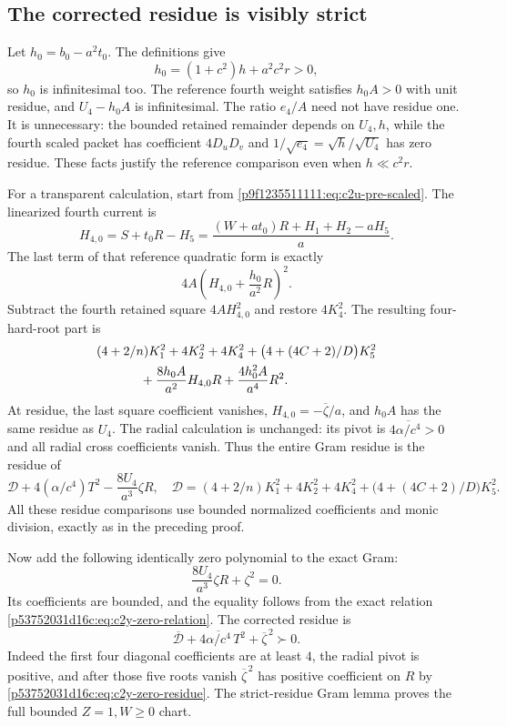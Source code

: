 \subsection{The corrected residue is visibly strict}
Let $h_0=b_0-a^2t_0$.  The definitions give
\begin{equation}
h_0=(1+c^2)h+a^2c^2r>0,
\label{p53752031d16c:eq:c2y-h0}
\end{equation}
so $h_0$ is infinitesimal too.  The reference fourth weight satisfies
$h_0A>0$ with unit residue, and $U_4-h_0A$ is infinitesimal.
The ratio $e_4/A$ need not have residue one.  It is unnecessary:
the bounded retained remainder depends on $U_4,h$, while the fourth
scaled packet has coefficient $4D_uD_v$ and
$1/\sqrt{e_4}=\sqrt h/\sqrt{U_4}$ has zero residue.  These facts
justify the reference comparison even when $h\ll c^2r$.

For a transparent calculation, start from
\eqref{p9f1235511111:eq:c2u-pre-scaled}.  The linearized fourth current is
\[
H_{4,0}=S+t_0R-H_5
=\frac{(W+at_0)R+H_1+H_2-aH_5}{a}.
\]
The last term of that reference quadratic form is exactly
\[
4A\left(H_{4,0}+\frac{h_0}{a^2}R\right)^2.
\]
Subtract the fourth retained square $4AH_{4,0}^2$ and restore
$4K_4^2$.  The resulting four-hard-root part is
\[
\begin{split}
&(4+2/n)K_1^2+4K_2^2+4K_4^2
 +\bigl(4+(4C+2)/D\bigr)K_5^2\\
&\hspace{12mm}+\frac{8h_0A}{a^2}H_{4,0}R
 +\frac{4h_0^2A}{a^4}R^2.
\end{split}
\]
At residue, the last square coefficient vanishes,
$H_{4,0}=-\overline\zeta/a$, and $h_0A$ has the same residue as $U_4$.
The radial calculation is unchanged: its pivot is
$4\overline{\alpha/c^4}>0$ and all radial cross coefficients vanish.
Thus the entire Gram residue is the residue of
\begin{equation}
\mathcal D+4(\alpha/c^4)T^2-\frac{8U_4}{a^3}\zeta R,
\quad
\mathcal D=(4+2/n)K_1^2+4K_2^2+4K_4^2
+\bigl(4+(4C+2)/D\bigr)K_5^2.
\label{p53752031d16c:eq:c2y-uncorrected}
\end{equation}
All these residue comparisons use bounded normalized coefficients and
monic division, exactly as in the preceding proof.

Now add the following identically zero polynomial to the exact Gram:
\begin{equation}
\frac{8U_4}{a^3}\zeta R+\zeta^2=0.
\label{p53752031d16c:eq:c2y-zero-correction}
\end{equation}
Its coefficients are bounded, and the equality follows from the exact
relation \eqref{p53752031d16c:eq:c2y-zero-relation}.  The corrected residue is
\[
\overline{\mathcal D}
+4\overline{\alpha/c^4}\,T^2+\overline\zeta^{\,2}\succ0.
\]
Indeed the first four diagonal coefficients are at least $4$, the radial
pivot is positive, and after those five roots vanish
$\overline\zeta^{\,2}$ has positive coefficient on $R$ by
\eqref{p53752031d16c:eq:c2y-zero-residue}.  The strict-residue Gram lemma proves the
full bounded $Z=1,W\geq0$ chart.


